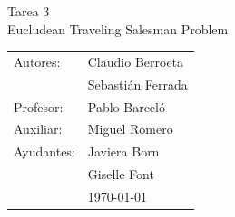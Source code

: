\documentclass[12pt,letterpaper, margin = 3cm]{article}
\begin{document}
\newpage
\pagestyle{fancy}
\fancyhf{}
\vspace*{5cm}
\begin{center}
\huge  {Tarea 3}\\
\Huge {Eucludean Traveling Salesman Problem}\\
\vspace{6cm}
\end{center}
\vfill
\begin{flushright}
\begin{tabular}{ll}
Autores: & Claudio Berroeta\\
& Sebastián Ferrada \\
Profesor: & Pablo Barceló\\
Auxiliar: & Miguel Romero\\
Ayudantes: & Javiera Born\\
& Giselle Font\\
& \today\\
\end{tabular}
\end{flushright}

\newpage
\pagestyle{fancy}
\fancyhf{}

\fancyhead[R]{\small \rm \textbf{\thepage}} %



\renewcommand{\sectionmark}[1]{\markright{\thesection.\ #1}}
\renewcommand{\headrulewidth}{0.5pt}
\renewcommand{\footrulewidth}{0.5pt}
\newcommand{\fancyfootnotetext}[2]{%
  \fancypagestyle{dingens}{%
    \fancyfoot[LO,RE]{\parbox{12cm}{\footnotemark[#1]\footnotesize #2}}%
  }%
  \thispagestyle{dingens}%
}
\end{document}
